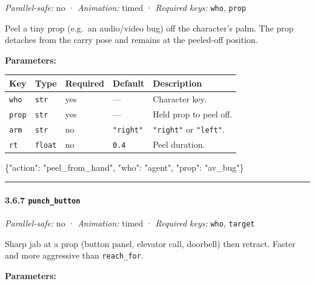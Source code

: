 \documentclass[
  11pt,
]{book}
\newenvironment{Shaded}{}{}
\newcommand{\DataTypeTok}[1]{\textcolor[rgb]{0.56,0.13,0.00}{#1}}
\newcommand{\FunctionTok}[1]{\textcolor[rgb]{0.02,0.16,0.49}{#1}}
\newcommand{\StringTok}[1]{\textcolor[rgb]{0.25,0.44,0.63}{#1}}
\begin{document}
\emph{Parallel-safe:} no · \emph{Animation:} timed · \emph{Required
keys:} \texttt{who}, \texttt{prop}

Peel a tiny prop (e.g.~an audio/video bug) off the character's palm. The
prop detaches from the carry pose and remains at the peeled-off
position.

\textbf{Parameters:}

\begin{longtable}[]{@{}lllll@{}}
\toprule\noalign{}
Key & Type & Required & Default & Description \\
\midrule\noalign{}
\endhead
\bottomrule\noalign{}
\endlastfoot
\texttt{who} & \texttt{str} & yes & --- & Character key. \\
\texttt{prop} & \texttt{str} & yes & --- & Held prop to peel off. \\
\texttt{arm} & \texttt{str} & no & \texttt{"right"} & \texttt{"right"}
or \texttt{"left"}. \\
\texttt{rt} & \texttt{float} & no & \texttt{0.4} & Peel duration. \\
\end{longtable}

\begin{Shaded}
\begin{Highlighting}[]
\FunctionTok{\{}\DataTypeTok{"action"}\FunctionTok{:} \StringTok{"peel\_from\_hand"}\FunctionTok{,} \DataTypeTok{"who"}\FunctionTok{:} \StringTok{"agent"}\FunctionTok{,} \DataTypeTok{"prop"}\FunctionTok{:} \StringTok{"av\_bug"}\FunctionTok{\}}
\end{Highlighting}
\end{Shaded}

\begin{center}\rule{0.5\linewidth}{0.5pt}\end{center}

\paragraph{\texorpdfstring{3.6.7
\texttt{punch\_button}}{3.6.7 punch\_button}}\label{punch_button}

\emph{Parallel-safe:} no · \emph{Animation:} timed · \emph{Required
keys:} \texttt{who}, \texttt{target}

Sharp jab at a prop (button panel, elevator call, doorbell) then
retract. Faster and more aggressive than \texttt{reach\_for}.

\textbf{Parameters:}
\end{document}

